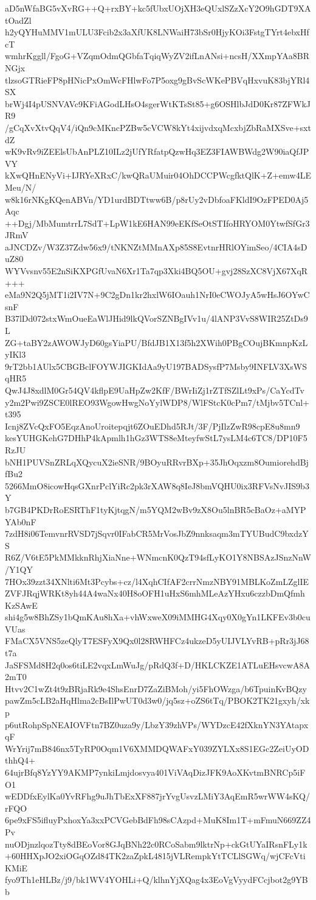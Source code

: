 aD5nWfaBG5vXvRG++Q+rxBY+kc5fUbxUOjXH3eQUxlSZzXcY2O9hGDT9XAtOadZl
h2yQYHuMMV1mULU3Fcib2x3aXfUK8LNWaiH73bSr0HjyKOi3FstgTYrt4ebxHfcT
wmhrKggll/FgoG+VZqmOdmQGbfaTqiqWyZV2ifLnANsi+ncsH/XXmpYAa8BRNGjx
tlzsoGTRieFP8pHNicPxOmWcFHlwFo7P5oxg9gBvScWKePBVqHxvuK83bjYRl4SX
brWj4I4pUSNVAVc9KFiAGodLHsO4sgerWtKTsSt85+g6OSHlbJdD0Kr87ZFWkJR9
/gCqXvXtvQqV4/iQn9cMKncPZBw5cVCW8kYt4xijvdxqMcxbjZbRaMXSve+sxtdZ
wK9vRv9iZEElsUbAnPLZ10ILz2jUfYRfatpQzwHq3EZ3FIAWBWdg2W90iaQfJPVY
kXwQHnENyVi+IJRYeXRxC/kwQRaUMuir04OhDCCPWcgfktQlK+Z+emw4LEMeu/N/
w8k16rNKgKQenABVn/YD1urdBDTtww6B/p8rUy2vDbfoaFKldI9OzFPED0Aj5Aqc
++Dgj/MbMumtrrL7SdT+LpW1kE6HAN99eEKfSeOtSTIfoHRYOM0YtwfSfGr3JRmV
aJNCDZv/W3Z37Zdw56x9/tNKNZtMMnAXp85S8EvtnrHRlOYimSeo/4CIA4sDuZ80
WYVvsnv55E2nSiKXPGfUvaN6Xr1Ta7qp3Xki4BQ5OU+gvj28SzXC8VjX67XqR+++
eMa9N2Q5jMT1i2IV7N+9C2gDn1kr2hxlW6IOauh1NrI0eCWOJyA5wHsJ6OYwCsnF
B37lDd072stxWmOueEaWlJHid9lkQVorSZNBgIVv1u/4lANP3VvS8WIR25ZtDs9L
ZG+taBY2zAWOWJyD60gsYiaPU/BfdJB1X13f5h2XWih0PBgCOujBKmnpKzLyIKl3
9rT2bb1AUlx5CBGBclFOYWJIGKIdAa9yU197BADSysfP7Msby9INFLV3XsWSqHR5
QwJ4J8xdlM0Gr54QV4kflpE9UaHpZw2KfF/BWrIiZj1rZTfSZlLt9xPs/CaYcdTv
y2m2Pwi9ZSCE0lREO93WgowHwgNoYylWDP8/WlFStcK0cPm7/tMjbv5TCnl+t395
Icnj8ZVcQxFO5EqzAnoUroitepqjt6ZOuEDhd5RJt/3F/PjIlzZwR98cpE8u8mn9
kesYUHGKehG7DHhP4kApmlh1hGz3WTS8eMteyfwStL7ysLM4c6TC8/DP10F5RzJU
bNH1PUVSnZRLqXQycuX2ieSNR/9BOyuRRvrBXp+35JhOqxzm8OumiorehdBjfBu2
5266MmO8icowHqsGXnrPclYiRc2pk3rXAW8q8IeJ8bmVQHU0ix3RFVsNvJIS9b3Y
b7GB4PKDrRoESRThF1tyKjtqgN/m5YQM2wBv9zX8Ou5lnBR5cBaOz+aMYPYAb0nF
7zdH8i06TemvnrRVSD7jSqvr0IFabCR5MrVosJbZ9nnksaqm3mTYUBudC9bxdzYS
R6Z/V6tE5PkMMkknRhjXiaNne+WNmcnK0QzT94sfLyKO1Y8NBSAzJSnzNnW/Y1QY
7HOx39zzt34XNlti6Mt3Pcybs+cz/l4XqhCIfAF2crrNmzNBY91MBLKoZmLZglIE
ZVFJRqjWRKt8yh44A4waNx40H8oOFH1uHxS6mhMLeAzYHxu6czzbDmQfmhKzSAwE
shi4g5w8BhZSy1bQmKAu8hXa+vhWxweX09iMMHG4Xqy0X0gYn1LKFEv3b0cuVUas
FMaCX5VNS5zeQlyT7ESFyX9Qx0l28RWHFCz4ukzeD5yUIJVLYvRB+pRr3jJ68t7a
JaSFSMd8H2q0os6tiLE2vqxLmWuJg/pRdQ3f+D/HKLCKZE1ATLuEHsvcwA8A2mT0
Htvv2C1wZt4t9zBRjaRk9e4ShsEnrD7ZaZiBMoh/yi5FhOWzga/b6TpuinKvBQzy
pawZm5cLB2aHqHlma2cBsIlPwUT0d3w0/jq5sz+oZS6tTq/PBOK2TK21gxyh/xkp
p6utRohpSpNEAIOVFtn7BZ0uza9y/LbzY39zhVPs/WYDzcE42fXknYN3YAtapxqF
WrYrij7mB846nx5TyRP0Oqm1V6XMMDQWAFxY039ZYLXx8S1EGc2ZeiUyODthhQ4+
64ujrBfq8YzYY9AKMP7ynkiLmjdosvya401ViVAqDizJFK9AoXKvtmBNRCp5iFO1
wEDDfxEylKa0YvRFhg9uJhTbExXF887jrYvgUsvzLMiY3AqEmR5wrWW4sKQ/rFQO
6pe9xFS5ifluyPxhoxYa3xxPCVGebBdFh98sCAzpd+MuK8Im1T+mFmuN669ZZ4Pv
nuODjnzlqozTty8dBEoVor8GJqBNh22c0RCoSabm9lktrNp+ckGtUYaIRsnFLy1k
+60HHXpJO2xiOGqOZd84TK2zaZpkL4815jVLRempkYtTCLlSGWq/wjCFcVtiKMiE
fyo9Th1eHLBz/j9/bk1WV4YOHLi+Q/klhnYjXQag4x3EoVgVyydFCcjbot2g9YBb
